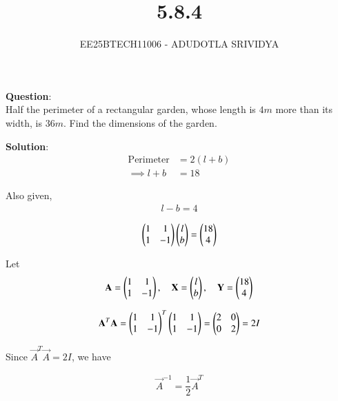\documentclass[journal]{IEEEtran}
\begin{document}

\vspace{3cm}

\title{5.8.4}
\author{EE25BTECH11006 - ADUDOTLA SRIVIDYA}
{\let\newpage\relax\maketitle}

\renewcommand{\thefigure}{\theenumi}
\renewcommand{\thetable}{\theenumi}
\setlength{\intextsep}{10pt} %

\textbf{Question}:\\
Half the perimeter of a rectangular garden, whose length is $4m$ more than its width,
is $36m$. Find the dimensions of the garden.

\textbf{Solution}:\\
\begin{align}
    \text{Perimeter} &= 2(l+b) \\
    \implies l+b &= 18
\end{align}

Also given,
\begin{align}
    l-b = 4
\end{align}

\begin{align}
    \begin{pmatrix}1 & 1 \\ 1 & -1\end{pmatrix}\begin{pmatrix}l \\ b\end{pmatrix} = \begin{pmatrix}18 \\ 4\end{pmatrix}
\end{align}

Let
\begin{align}
    \mathbf{A} = \begin{pmatrix}1 & 1 \\ 1 & -1\end{pmatrix}, \quad \mathbf{X} = \begin{pmatrix}l \\ b\end{pmatrix}, \quad \mathbf{Y} = \begin{pmatrix}18 \\ 4\end{pmatrix}
\end{align}

\begin{align}
    \mathbf{A}^T \mathbf{A} = \begin{pmatrix}1 & 1 \\ 1 & -1\end{pmatrix}^T \begin{pmatrix}1 & 1 \\ 1 & -1\end{pmatrix} 
          = \begin{pmatrix}2 & 0 \\ 0 & 2\end{pmatrix} = 2I
\end{align}

Since $\vec{A}^T \vec{A} = 2I$, we have

\begin{align}
    \vec{A}^{-1} = \dfrac{1}{2}\vec{A}^T
\end{align}
\end{document}
